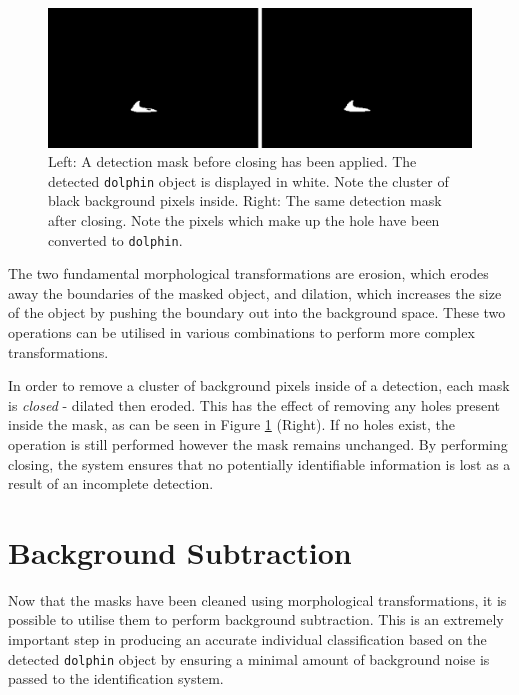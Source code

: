 \begin{figure}[h]
	\begin{center}
		\includegraphics[scale=0.5]{Chapter4/figs/before-and-after-morphing-masks-only.png}
	\end{center}
	\caption{Left: A detection mask before closing has been applied. The detected \texttt{dolphin} object is displayed in white. Note the cluster of black background pixels inside. Right: The same detection mask after closing. Note the pixels which make up the hole have been converted to \texttt{dolphin}.}
	\label{fig:before-and-after-morphing-masks-only}
\end{figure}

The two fundamental morphological transformations are erosion, which erodes away the boundaries of the masked object, and dilation, which increases the size of the object by pushing the boundary out into the background space. These two operations can be utilised in various combinations to perform more complex transformations.

In order to remove a cluster of background pixels inside of a detection, each mask is \textit{closed} - dilated then eroded. This has the effect of removing any holes present inside the mask, as can be seen in Figure \ref{fig:before-and-after-morphing-masks-only} (Right). If no holes exist, the operation is still performed however the mask remains unchanged. By performing closing, the system ensures that no potentially identifiable information is lost as a result of an incomplete detection. 

\section{Background Subtraction}\label{ch:postProcessing,sec:bgExtraction}

Now that the masks have been cleaned using morphological transformations, it is possible to utilise them to perform background subtraction. This is an extremely important step in producing an accurate individual classification based on the detected \texttt{dolphin} object by ensuring a minimal amount of background noise is passed to the identification system.

